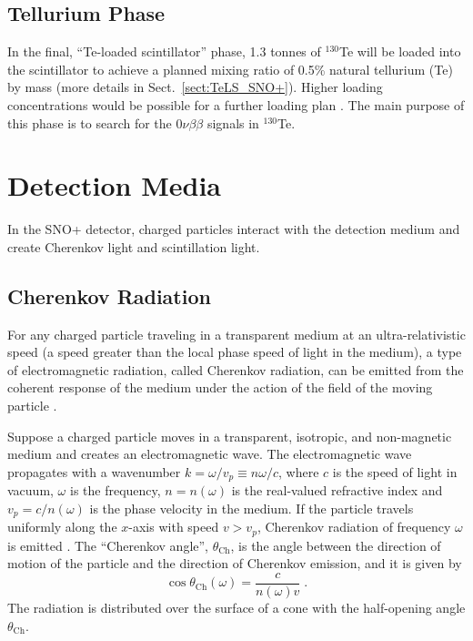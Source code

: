 \subsection{Tellurium Phase} \label{sect:tePhase}

In the final, ``Te-loaded scintillator'' phase, 1.3 tonnes of $^{130}$Te will be loaded into the scintillator to achieve a planned mixing ratio of 0.5\% natural tellurium (Te) by mass (more details in Sect.~\ref{sect:TeLS_SNO+}). Higher loading concentrations would be possible for a further loading plan \cite{Paton:2019kgy}. The main purpose of this phase is to search for the $0\nu\beta\beta$ signals in $^{130}$Te.

\section{Detection Media} \label{sect:detectionMedia}

In the SNO+ detector, charged particles interact with the detection medium and create Cherenkov light and scintillation light. 

\subsection{Cherenkov Radiation}\label{sect:cherenkov}

For any charged particle traveling in a transparent medium at an ultra-relativistic speed (a speed greater than the local phase speed of light in the medium), a type of electromagnetic radiation, called Cherenkov radiation, can be emitted from the coherent response of the medium under the action of the field of the moving particle \cite{jackson2007classical,landau2013electrodynamics}.

Suppose a charged particle moves in a transparent, isotropic, and non-magnetic medium and creates an electromagnetic wave. The electromagnetic wave propagates with a wavenumber $k=\omega/v_p \equiv n\omega/c$, where $c$ is the speed of light in vacuum, $\omega$ is the frequency, $n=n(\omega)$ is the real-valued refractive index and $v_p=c/n(\omega)$ is the phase velocity in the medium. If the particle travels uniformly along the $x$-axis with speed $v>v_p$, Cherenkov radiation of frequency $\omega$ is emitted \cite{landau2013electrodynamics}. The ``Cherenkov angle'', $\theta_\mathrm{Ch}$, is the angle between the direction of motion of the particle and the direction of Cherenkov emission, and it is given by 
\begin{equation}
\cos\theta_\mathrm{Ch}(\omega) = \frac{c}{n(\omega)v} \; .
\end{equation}
The radiation is distributed over the surface of a cone with the half-opening angle $\theta_\mathrm{Ch}$. 

